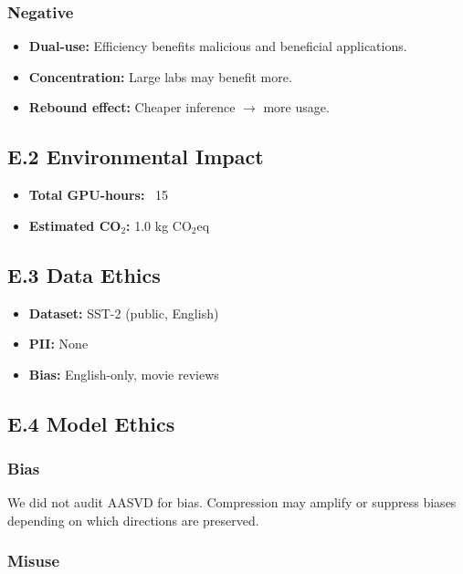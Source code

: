 \subsubsection{Negative}
\begin{itemize}
\item \textbf{Dual-use:} Efficiency benefits malicious and beneficial applications.
\item \textbf{Concentration:} Large labs may benefit more.
\item \textbf{Rebound effect:} Cheaper inference $\to$ more usage.

\end{itemize}
\subsection{E.2 Environmental Impact}

\begin{itemize}
\item \textbf{Total GPU-hours:} ~15
\item \textbf{Estimated CO$_2$:} 1.0 kg CO$_2$eq

\end{itemize}
\subsection{E.3 Data Ethics}

\begin{itemize}
\item \textbf{Dataset:} SST-2 (public, English)
\item \textbf{PII:} None
\item \textbf{Bias:} English-only, movie reviews

\end{itemize}
\subsection{E.4 Model Ethics}

\subsubsection{Bias}

We did not audit AASVD for bias. Compression may amplify or suppress biases 
depending on which directions are preserved.

\subsubsection{Misuse}

